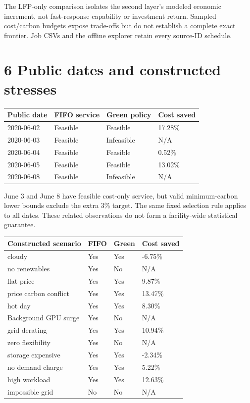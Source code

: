 \documentclass[10pt,a4paper]{article}
\begin{document}
The LFP-only comparison isolates the second layer's modeled economic increment, not fast-response capability or investment return. Sampled cost/carbon budgets expose trade-offs but do not establish a complete exact frontier. Job CSVs and the offline explorer retain every source-ID schedule.

\clearpage
\section*{6  Public dates and constructed stresses}
\begin{center}\begingroup\setlength{\tabcolsep}{4pt}
\renewcommand{\arraystretch}{1.2}
\fontsize{8.4}{11.76}\selectfont
\begin{tabular}{@{}p{128.29pt}p{109.29pt}p{114.04pt}p{107.39pt}@{}}
\toprule
\textbf{Public date} & \textbf{FIFO service} & \textbf{Green policy} & \textbf{Cost saved} \\
\midrule
2020-06-02 & Feasible & Feasible & 17.28\% \\
2020-06-03 & Feasible & Infeasible & N/A \\
2020-06-04 & Feasible & Feasible & 0.52\% \\
2020-06-05 & Feasible & Feasible & 13.02\% \\
2020-06-08 & Feasible & Infeasible & N/A \\
\bottomrule\end{tabular}\endgroup\end{center}

June 3 and June 8 have feasible cost-only service, but valid minimum-carbon lower bounds exclude the extra 3\% target. The same fixed selection rule applies to all dates. These related observations do not form a facility-wide statistical guarantee.

\begin{center}\begingroup\setlength{\tabcolsep}{4pt}
\renewcommand{\arraystretch}{1.2}
\fontsize{8.4}{11.76}\selectfont
\begin{tabular}{@{}p{213.82pt}p{66.52pt}p{71.27pt}p{107.39pt}@{}}
\toprule
\textbf{Constructed scenario} & \textbf{FIFO} & \textbf{Green} & \textbf{Cost saved} \\
\midrule
cloudy & Yes & Yes & -6.75\% \\
no renewables & Yes & No & N/A \\
flat price & Yes & Yes & 9.87\% \\
price carbon conflict & Yes & Yes & 13.47\% \\
hot day & Yes & Yes & 8.30\% \\
Background GPU surge & Yes & No & N/A \\
grid derating & Yes & Yes & 10.94\% \\
zero flexibility & Yes & No & N/A \\
storage expensive & Yes & Yes & -2.34\% \\
no demand charge & Yes & Yes & 5.22\% \\
high workload & Yes & Yes & 12.63\% \\
impossible grid & No & No & N/A \\
\bottomrule\end{tabular}\endgroup\end{center}
\end{document}
